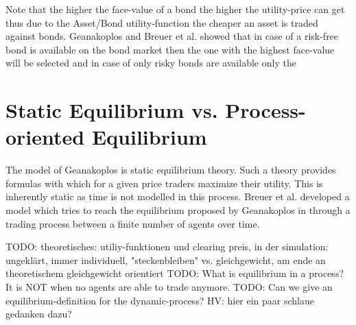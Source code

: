 \documentclass[../Bachelorarbeit.tex]{subfiles}
\begin{document}
Note that the higher the face-value of a bond the higher the utility-price can get thus due to the Asset/Bond utility-function the cheaper an asset is traded against bonds. Geanakoplos and Breuer et al. showed that in case of a risk-free bond is available on the bond market then the one with the highest face-value will be selected and in case of only risky bonds are available only the 


\section{Static Equilibrium vs. Process-oriented Equilibrium}
The model of Geanakoplos is static equilibrium theory. Such a theory provides formulas with which for a given price traders maximize their utility. This is inherently static as time is not modelled in this process. Breuer et al. developed a model which tries to reach the equilibrium proposed by Geanakoplos in \cite{Geanakoplos2009} through a trading process between a finite number of agents over time.

\medskip

TODO: theoretisches: utiliy-funktionen und clearing preis, in der simulation: ungeklärt, immer individuell, "steckenbleiben" vs. gleichgewicht, am ende an theoretischem gleichgewicht orientiert
TODO: What is equilibrium in a process? It is NOT when no agents are able to trade anymore.
TODO: Can we give an equilibrium-definition for the dynamic-process? HV: hier ein paar schlaue gedanken dazu?
\end{document}
